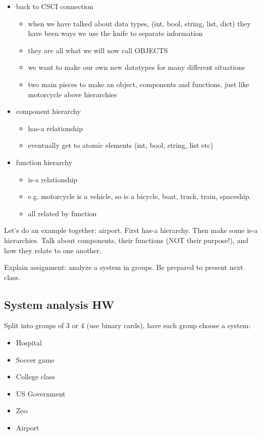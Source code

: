 \documentclass{article}
\begin{document}
\begin{itemize}
\item back to CSCI connection
  \begin{itemize}
  \item when we have talked about data types, (int, bool, string, list, dict)
    they have been ways we use the knife to separate information
  \item they are all what we will now call OBJECTS
  \item we want to make our own new datatypes for many different situations
  \item two main pieces to make an object, components and functions, just like motorcycle above
    hierarchies
  \end{itemize}
\item component hierarchy
  \begin{itemize}
  \item has-a relationship
  \item eventually get to atomic elements (int, bool, string, list etc)
  \end{itemize}
\item function hierarchy
  \begin{itemize}
  \item is-a relationship
  \item e.g. motorcycle is a vehicle, so is a bicycle, boat, truck, train, spaceship.
  \item all related by function
  \end{itemize}
\end{itemize}

  Let's do an example together: airport.  First has-a hierarchy.  Then
  make some is-a hierarchies.  Talk about components, their functions
  (NOT their purpose!), and how they relate to one another.

  Explain assignment: analyze a system in groups.  Be prepared to
  present next class.

\subsection*{System analysis HW}

Split into groups of 3 or 4 (use binary cards), have each group choose
a system:

\begin{itemize}
\item Hospital
\item Soccer game
\item College class
\item US Government
\item Zoo
\item Airport
\end{itemize}
\end{document}
